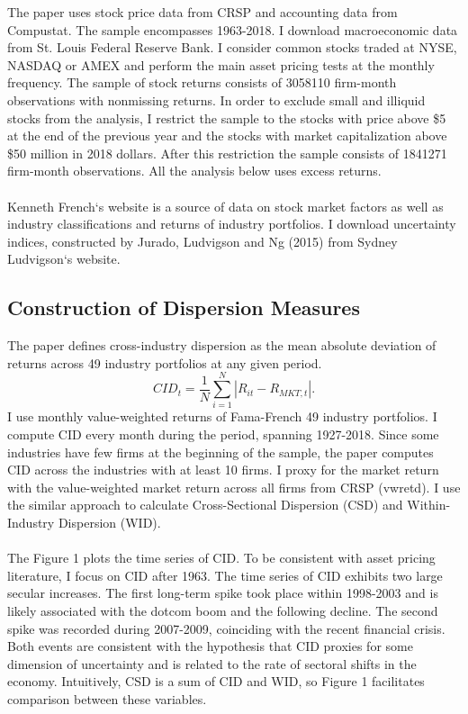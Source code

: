\documentclass[12pt]{article}
\begin{document}
The paper uses stock price data from CRSP and accounting data from Compustat. The sample encompasses 1963-2018. I download macroeconomic data from St. Louis Federal Reserve Bank. 
I consider common stocks traded at NYSE, NASDAQ or AMEX and perform the main asset pricing tests at the monthly frequency. The sample of stock returns consists of 3058110 firm-month observations with nonmissing returns. In order to exclude small and illiquid stocks from the analysis, I restrict the sample to the stocks with price above \$5 at the end of the previous year and the stocks with market capitalization above \$50 million in 2018 dollars. After this restriction the sample consists of 1841271 firm-month observations. All the analysis below uses excess returns.
\paragraph{}
Kenneth French`s website is a source of data on stock market factors as well as industry classifications and returns of industry portfolios. I download uncertainty indices, constructed by Jurado, Ludvigson and Ng (2015) from Sydney Ludvigson`s website. 

\subsection{Construction of Dispersion Measures}

The paper defines cross-industry dispersion as the mean absolute deviation of returns across 49 industry portfolios at any given period.
\begin{equation}
CID_t = \frac{1}{N}\sum^{N}_{i=1}{|R_{it}-R_{MKT,t}|}.
\end{equation}
I use monthly value-weighted returns of Fama-French 49 industry portfolios. I compute CID every month during the period, spanning 1927-2018. Since some industries have few firms at the beginning of the sample, the paper computes CID across the industries with at least 10 firms. I proxy for the market return with the value-weighted market return across all firms from CRSP (vwretd). I use the similar approach to calculate Cross-Sectional Dispersion (CSD) and Within-Industry Dispersion (WID).
\paragraph{}
The Figure 1 plots the time series of CID. To be consistent with asset pricing literature, I focus on CID after 1963. The time series of CID exhibits two large secular increases. The first long-term spike took place within 1998-2003 and is likely associated with the dotcom boom and the following decline. The second spike was recorded during 2007-2009, coinciding with the recent financial crisis. Both events are consistent with the hypothesis that CID proxies for some dimension of uncertainty and is related to the rate of sectoral shifts in the economy. Intuitively, CSD is a sum of CID and WID, so Figure 1 facilitates comparison between these variables. 
\end{document}

